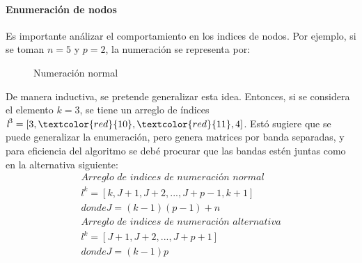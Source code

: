 \documentclass[12pt]{article}
\begin{document}
\paragraph{Enumeración de nodos}
Es importante análizar el comportamiento en los indices de nodos. Por ejemplo, si se toman $n=5$ y $p=2$, la numeración se representa por: 
\begin{figure}[h]
		\caption{Numeración normal}
	{\LARGE
		\centering
		}
\end{figure}

De manera inductiva, se pretende generalizar esta idea. Entonces, si se considera el elemento $k=3$, se tiene un arreglo de índices $\textit{l}^3=[3, \textcolor{red}{10}, \textcolor{red}{11}, 4]$. 
Estó sugiere que se puede generalizar la enumeración, pero genera matrices por banda separadas, y para eficiencia del algoritmo se debé procurar que las bandas estén juntas como en la alternativa siguiente:
\begin{equation*}
\begin{array}{l}
\textit{Arreglo de indices de numeración normal}\\
 \textit{l}^k = [k, J+1,J+2, ..., J+p-1, k+1]\\ 
 donde J= (k-1)(p-1)+n\\[0.3cm]
 \textit{Arreglo de indices de numeración alternativa}\\
\textit{l}^k = [J+1,J+2, ..., J+p+1]\\
donde J= (k-1)p
\end{array} 
\end{equation*}
\end{document}
